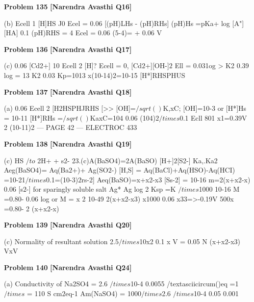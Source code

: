 \begin{problembox}
\textbf{Problem 135} \hfill \textbf{[Narendra Avasthi Q16]}
\label{q:ext-narendra_avasthi_all_questions-135}

(b)
Ecell
1
[H]HS
J0
Ecel = 0.06 [(pH)LHs - (pH)RHs]
(pH)Hs =pKa+ log
[A"]
[HA]
0.1
(pH)RHS = 4
Ecel = 0.06 (5-4)= + 0.06 V
\end{problembox}

\begin{problembox}
\textbf{Problem 136} \hfill \textbf{[Narendra Avasthi Q17]}
\label{q:ext-narendra_avasthi_all_questions-136}

(c)
0.06
[Cd2+]
10
Ecell
2
[H]?
Ecell = 0,
[Cd$2$+][OH-]$2$
Ell = 0.031og >
K2
0.39
log
= 13
K2
0.03
Kp=1013
x(10-14)$2$=10-15
[H*]RHSPHUS
\end{problembox}

\begin{problembox}
\textbf{Problem 137} \hfill \textbf{[Narendra Avasthi Q18]}
\label{q:ext-narendra_avasthi_all_questions-137}

(a)
0.06
Ecell
2
[H2HSPHJRHS
[>>
[OH]=$/sqrt()$K,xC; [OH]=10-3
or
[H*]Hs = 10-11
[H*]RHs =$/sqrt()$KaxC=104
0.06
(104)$2$$/times$0.1
Ecll
801
x1=0.39V
2
(10-11)2
--- PAGE 42 ---
ELECTROC
433
\end{problembox}

\begin{problembox}
\textbf{Problem 138} \hfill \textbf{[Narendra Avasthi Q19]}
\label{q:ext-narendra_avasthi_all_questions-138}

(c)
HS $/to$ 2H+ + s2-
23.(c)A(BaSO4)=2A(BaSO)
[H+]$2$[S2-]
Ka,.Ka2
Aeg(BaSO4)= Aq(Ba$2$+)+ Ag(SO$2$-)
[H,S]
= Aq(BaCl)+Aq(HSO)-Aq(HCI)
=10-21$/times$0.1=(10-3)$2$rs-2]
Aeq(BaSO)=x+x2-x3
[Ss-2] = 10-16
m=2(x+x2-x)
0.06
[s$2$-]
for sparingly soluble salt
Ag* Ag
log
2
Ksp
=K
$/times$1000
10-16
M
=0.80-
0.06
log
or M =
x
2
10-49
2(x+x2-x3)
x1000
0.06
x33=>-0.19V
500x
=0.80-
2
(x+x2-x)
\end{problembox}

\begin{problembox}
\textbf{Problem 139} \hfill \textbf{[Narendra Avasthi Q20]}
\label{q:ext-narendra_avasthi_all_questions-139}

(c) Normality of resultant solution
2.5$/times$10x2
0.1 x V
= 0.05 N
(x+x2-x3)
VxV
\end{problembox}

\begin{problembox}
\textbf{Problem 140} \hfill \textbf{[Narendra Avasthi Q24]}
\label{q:ext-narendra_avasthi_all_questions-140}

(a) Conductivity of Na2SO4 = 2.6 $/times$10-4
0.0055
/textasciicircum()eq =1 $/times$
= 110 S cm$2$eq-1
Am(NaSO4) =
1000$/times$2.6 $/times$10-4
0.05
0.001
\end{problembox}

